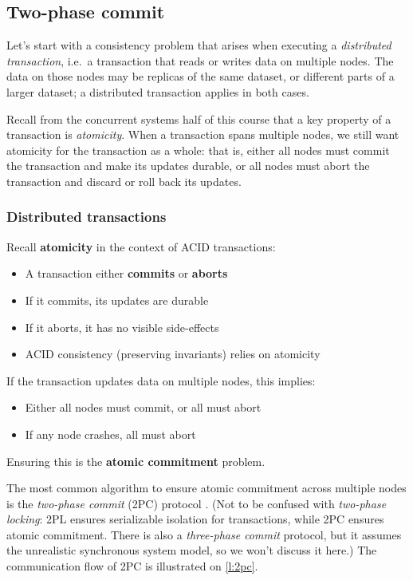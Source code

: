 \subsection{Two-phase commit}\label{sec:2pc}

Let's start with a consistency problem that arises when executing a \emph{distributed transaction}, i.e.\ a transaction that reads or writes data on multiple nodes.
The data on those nodes may be replicas of the same dataset, or different parts of a larger dataset; a distributed transaction applies in both cases.

Recall from the concurrent systems half of this course that a key property of a transaction is \emph{atomicity}.
When a transaction spans multiple nodes, we still want atomicity for the transaction as a whole: that is, either all nodes must commit the transaction and make its updates durable, or all nodes must abort the transaction and discard or roll back its updates.

\begin{frame}
    \label{s:atomic-commit}
    \frametitle{Distributed transactions}
    Recall \textbf{atomicity} in the context of ACID transactions:
    \begin{itemize}
        \item A transaction either \textbf{commits} or \textbf{aborts}\pause
        \item If it commits, its updates are durable
        \item If it aborts, it has no visible side-effects\pause
        \item ACID consistency (preserving invariants) relies on atomicity\pause\\[1em]
    \end{itemize}
    If the transaction updates data on multiple nodes, this implies:
    \begin{itemize}
        \item Either all nodes must commit, or all must abort\pause
        \item If any node crashes, all must abort\\[1em]
    \end{itemize}
    Ensuring this is the \textbf{atomic commitment} problem.
\end{frame}
\label{l:atomic-commit}

The most common algorithm to ensure atomic commitment across multiple nodes is the \emph{two-phase commit} (2PC) protocol \citep{Gray:1978}.
(Not to be confused with \emph{two-phase locking}: 2PL ensures serializable isolation for transactions, while 2PC ensures atomic commitment.
There is also a \emph{three-phase commit} protocol, but it assumes the unrealistic synchronous system model, so we won't discuss it here.)
The communication flow of 2PC is illustrated on \autoref{l:2pc}.

